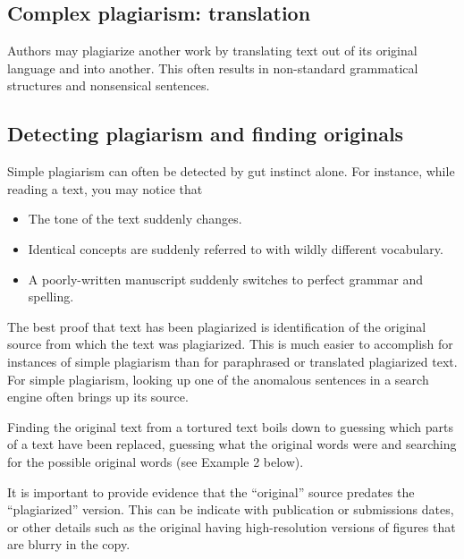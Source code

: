 \documentclass[letterpaper, 12pt]{article}
\begin{document}
\subsection*{Complex plagiarism: translation}

Authors may plagiarize another work by translating text out of its original language and into another. This often results in non-standard grammatical structures and nonsensical sentences.

\subsection*{Detecting plagiarism and finding originals}

Simple plagiarism can often be detected by gut instinct alone. For instance, while reading a text, you may notice that

\begin{itemize}
    \setlength\itemsep{-0.5em}
    \item The tone of the text suddenly changes.
    \item Identical concepts are suddenly referred to with wildly different vocabulary.
    \item A poorly-written manuscript suddenly switches to perfect grammar and spelling.
\end{itemize}

The best proof that text has been plagiarized is identification of the original source from which the text was plagiarized. This is much easier to accomplish for instances of simple plagiarism than for paraphrased or translated plagiarized text. For simple plagiarism, looking up one of the anomalous sentences in a search engine often brings up its source.

Finding the original text from a tortured text boils down to guessing which parts of a text have been replaced, guessing what the original words were and searching for the possible original words (see Example 2 below).

It is important to provide evidence that the ``original'' source predates the ``plagiarized'' version.
This can be indicate with publication or submissions dates, or other details such as the original having high-resolution versions of figures that are blurry in the copy.
\end{document}
